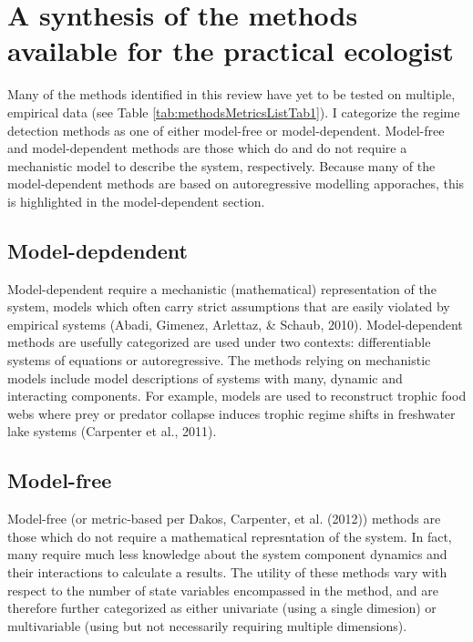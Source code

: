 \documentclass[12pt,twoside,openany]{reedthesis}
\begin{document}
\hypertarget{a-synthesis-of-the-methods-available-for-the-practical-ecologist}{%
\section{A synthesis of the methods available for the practical ecologist}\label{a-synthesis-of-the-methods-available-for-the-practical-ecologist}}

Many of the methods identified in this review have yet to be tested on multiple, empirical data (see Table \ref{tab:methodsMetricsListTab1}). I categorize the regime detection methods as one of either model-free or model-dependent. Model-free and model-dependent methods are those which do and do not require a mechanistic model to describe the system, respectively. Because many of the model-dependent methods are based on autoregressive modelling apporaches, this is highlighted in the model-dependent section.

\hypertarget{model-depdendent}{%
\subsection{Model-depdendent}\label{model-depdendent}}

Model-dependent require a mechanistic (mathematical) representation of the system, models which often carry strict assumptions that are easily violated by empirical systems (Abadi, Gimenez, Arlettaz, \& Schaub, 2010). Model-dependent methods are usefully categorized are used under two contexts: differentiable systems of equations or autoregressive. The methods relying on mechanistic models include model descriptions of systems with many, dynamic and interacting components. For example, models are used to reconstruct trophic food webs where prey or predator collapse induces trophic regime shifts in freshwater lake systems (Carpenter et al., 2011).

\hypertarget{model-free}{%
\subsection{Model-free}\label{model-free}}

Model-free (or metric-based per Dakos, Carpenter, et al. (2012)) methods are those which do not require a mathematical represntation of the system. In fact, many require much less knowledge about the system component dynamics and their interactions to calculate a results. The utility of these methods vary with respect to the number of state variables encompassed in the method, and are therefore further categorized as either univariate (using a single dimesion) or multivariable (using but not necessarily requiring multiple dimensions).
\end{document}
